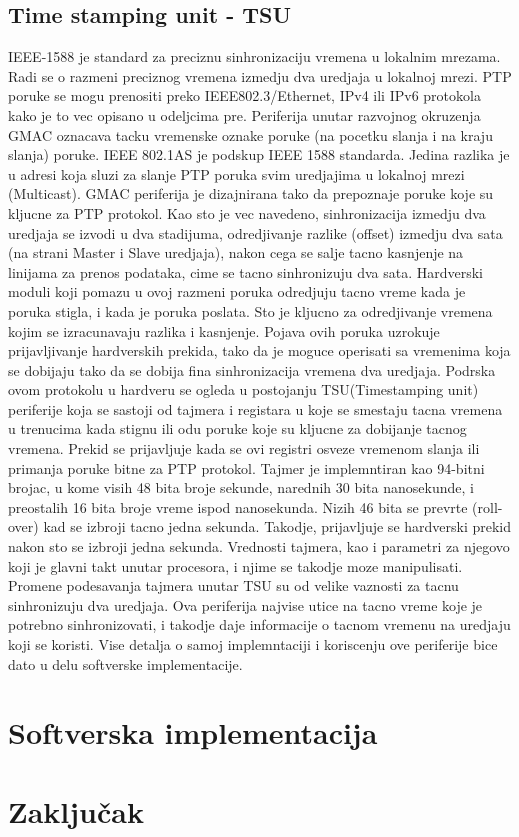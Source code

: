 \documentclass[a4paper,12pt, master]{etf}
\begin{document}
	\section{Time stamping unit - TSU}
	IEEE-1588 je standard za preciznu sinhronizaciju vremena u lokalnim mrezama. Radi se o 
	razmeni	preciznog vremena izmedju dva uredjaja u lokalnoj mrezi. PTP poruke se mogu 
	prenositi preko	IEEE802.3/Ethernet, IPv4 ili IPv6 protokola kako je to vec opisano u 
	odeljcima pre. Periferija unutar razvojnog okruzenja GMAC oznacava tacku vremenske oznake 
	poruke (na pocetku slanja i na kraju slanja) poruke. IEEE 802.1AS je podskup IEEE 1588 
	standarda. Jedina razlika je u adresi koja sluzi za slanje PTP poruka svim uredjajima u 
	lokalnoj mrezi (Multicast). GMAC periferija	je dizajnirana tako da prepoznaje poruke koje 
	su kljucne za PTP protokol. Kao sto je vec navedeno, sinhronizacija izmedju dva uredjaja 
	se izvodi u dva stadijuma, odredjivanje razlike	(offset) izmedju dva sata (na strani 
	Master i Slave uredjaja), nakon cega se salje tacno	kasnjenje na linijama za prenos 
	podataka, cime se tacno sinhronizuju dva sata. Hardverski moduli koji pomazu u ovoj 
	razmeni poruka odredjuju tacno vreme kada je poruka stigla, i kada je poruka poslata. Sto 
	je kljucno za odredjivanje vremena kojim se izracunavaju razlika i kasnjenje. Pojava ovih 
	poruka uzrokuje prijavljivanje hardverskih prekida, tako da je moguce operisati sa 
	vremenima koja se dobijaju tako da se dobija fina sinhronizacija vremena dva uredjaja.
	Podrska ovom protokolu u hardveru se ogleda u postojanju TSU(Timestamping unit) periferije 
	koja se sastoji od tajmera i registara u koje se smestaju tacna vremena u trenucima kada 
	stignu ili odu poruke koje su kljucne za dobijanje tacnog vremena. Prekid se prijavljuje 
	kada se ovi	registri osveze vremenom slanja ili primanja poruke bitne za PTP protokol.
	Tajmer je implemntiran kao 94-bitni brojac, u kome visih 48 bita broje sekunde, narednih 30
	bita nanosekunde, i preostalih 16 bita broje vreme ispod nanosekunda. Nizih 46 bita se 
	prevrte	(roll-over) kad se izbroji tacno jedna sekunda. Takodje, prijavljuje se hardverski 
	prekid nakon sto se izbroji jedna sekunda. Vrednosti tajmera, kao i parametri za njegovo 
	koji je glavni takt	unutar procesora, i njime se takodje moze manipulisati.
	Promene podesavanja tajmera unutar TSU su od velike vaznosti za tacnu sinhronizuju dva
	uredjaja. Ova periferija najvise utice na tacno vreme koje je potrebno sinhronizovati, i
	takodje daje informacije o tacnom vremenu na uredjaju koji se koristi. Vise detalja o samoj
	implemntaciji i koriscenju ove periferije bice dato u delu softverske implementacije.

	\newpage

	\chapter{Softverska implementacija}

	\newpage

	\chapter{Zaključak}

	\newpage
\end{document}
